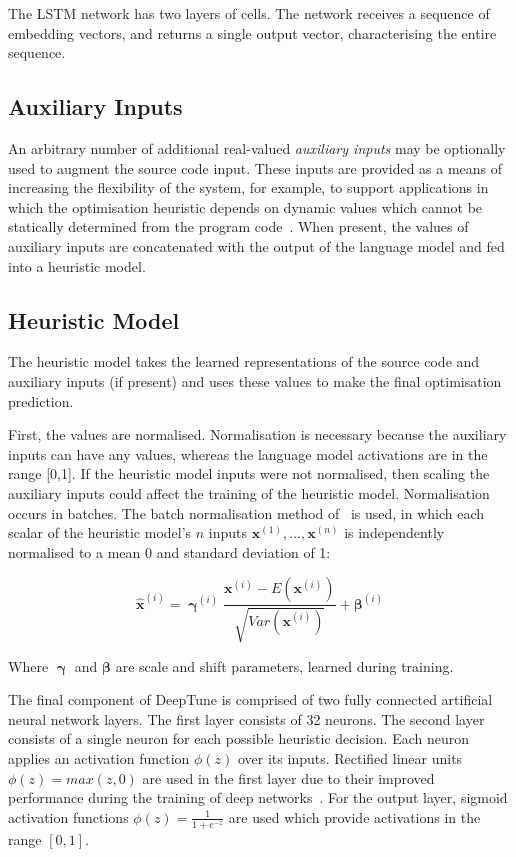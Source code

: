 The LSTM network has two layers of cells. The network receives a sequence of embedding vectors, and returns a single output vector, characterising the entire sequence.


\subsection{Auxiliary Inputs}

An arbitrary number of additional real-valued \emph{auxiliary inputs} may be optionally used to augment the source code input. These inputs are provided as a means of increasing the flexibility of the system, for example, to support applications in which the optimisation heuristic depends on dynamic values which cannot be statically determined from the program code~\cite{Ding2015,Stephenson2005}. When present, the values of auxiliary inputs are concatenated with the output of the language model and fed into a heuristic model.


\subsection{Heuristic Model}

The heuristic model takes the learned representations of the source code and auxiliary inputs (if present) and uses these values to make the final optimisation prediction.

First, the values are normalised. Normalisation is necessary because the auxiliary inputs can have any values, whereas the language model activations are in the range [0,1]. If the heuristic model inputs were not normalised, then scaling the auxiliary inputs could affect the training of the heuristic model. Normalisation occurs in batches. The batch normalisation method of~\cite{Ioffe2015a} is used, in which each scalar of the heuristic model's $n$ inputs $\bm{x}^{(1)}, \ldots, \bm{x}^{(n)}$ is independently normalised to a mean 0 and standard deviation of 1:

\begin{equation}
\bm{\hat{x}}^{(i)} = \bm{\upgamma}^{(i)} \frac{\bm{x}^{(i)} - E(\bm{x}^{(i)})}{\sqrt{Var(\bm{x}^{(i)})}} + \bm{\beta}^{(i)}
\end{equation}

Where $\bm{\upgamma}$ and $\bm{\beta}$ are scale and shift parameters, learned during training.

The final component of DeepTune is comprised of two fully connected artificial neural network layers. The first layer consists of 32 neurons. The second layer consists of a single neuron for each possible heuristic decision. Each neuron applies an activation function $\phi(z)$ over its inputs. Rectified linear units $\phi(z) = max(z, 0)$ are used in the first layer due to their improved performance during the training of deep networks~\cite{Nair2010}. For the output layer, sigmoid activation functions $\phi(z) = \frac{1}{1 + e^{-z}}$ are used which provide activations in the range $[0,1]$.

